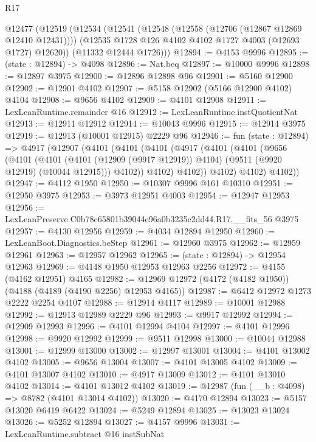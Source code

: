 \begin{lexlean}{R17}
\begin{coremodule}
  @12477
    (@12519
      (@12534
        (@12541
          (@12548 (@12558 (@12706 (@12867 @12869 @12410 @12431))))
          (@12535 @1728 @126 @4102 @4102 @1727 @4003 (@12693 @1727) @12620))
        (@11332 @12444 @1726)))
@12894 := @4153 @9996
@12895 := (state : @12894) -> @4098
@12896 := Nat.beq
@12897 := @10000 @9996
@12898 := @12897 @3975
@12900 := @12896 @12898 @96
@12901 := @5160 @12900
@12902 := @12901 @4102
@12907 := @5158 @12902 (@5166 @12900 @4102) @4104
@12908 := @9656 @4102
@12909 := @4101 @12908
@12911 := LexLeanRuntime.remainder @16
@12912 := LexLeanRuntime.instQuotientNat
@12913 := @12911 @12912
@12914 := @10043 @9996
@12915 := @12914 @3975
@12919 := @12913 (@10001 @12915) @2229 @96
@12946 := fun (state : @12894) =>
  @4917
    (@12907
      (@4101
        (@4101
          (@4101
            (@4917
              (@4101
                (@4101
                  (@9656
                    (@4101
                      (@4101
                        (@4101 (@12909 (@9917 @12919)) @4104)
                        (@9511 (@9920 @12919) (@10044 @12915)))
                      @4102))
                  @4102)
                @4102))
            @4102)
          @4102)
        @4102))
@12947 := @4112 @1950
@12950 := @10307 @9996 @161 @10310
@12951 := @12950 @3975
@12953 := @3973 @12951 @4003
@12954 := @12947 @12953
@12956 := LexLeanPreserve.C0b78c65801b39044e96a0b3235c2dd44.R17.__fits_56 @3975
@12957 := @4130 @12956
@12959 := @4034 @12894 @12950
@12960 := LexLeanBoot.Diagnostics.beStep
@12961 := @12960 @3975
@12962 := @12959 @12961
@12963 := @12957 @12962
@12965 := (state : @12894) -> @12954 @12963
@12969 := @4148 @1950 @12953 @12963 @2256
@12972 := @4155 (@4162 @12951) @4165
@12982 := @12969 @12972 (@4172 (@4182 @1950)) (@4188 (@4189 (@4190 @2256) @12953 @4165))
@12987 := @6412 @12972 @1273 @2222 @2254 @4107
@12988 := @12914 @4117
@12989 := @10001 @12988
@12992 := @12913 @12989 @2229 @96
@12993 := @9917 @12992
@12994 := @12909 @12993
@12996 := @4101 @12994 @4104
@12997 := @4101 @12996
@12998 := @9920 @12992
@12999 := @9511 @12998
@13000 := @10044 @12988
@13001 := @12999 @13000
@13002 := @12997 @13001
@13004 := @4101 @13002 @4102
@13005 := @9656 @13004
@13007 := @4101 @13005 @4102
@13009 := @4101 @13007 @4102
@13010 := @4917 @13009
@13012 := @4101 @13010 @4102
@13014 := @4101 @13012 @4102
@13019 := @12987 (fun (__b : @4098) => @8782 (@4101 @13014 @4102))
@13020 := @4170 @12894
@13023 := @5157 @13020 @6419 @6422
@13024 := @5249 @12894
@13025 := @13023 @13024
@13026 := @5252 @12894
@13027 := @4157 @9996
@13031 := LexLeanRuntime.subtract @16 instSubNat

\end{coremodule}
\end{lexlean}
